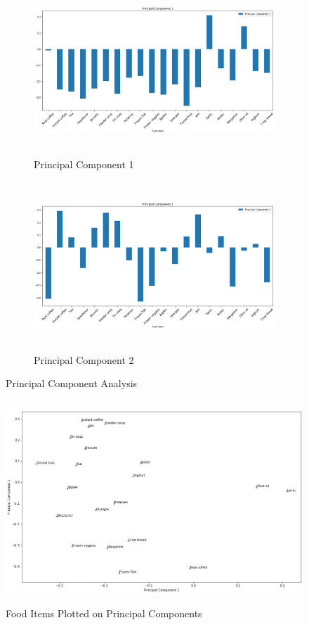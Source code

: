 \documentclass[twoside,10pt]{article}
\begin{document}
\begin{enumerate}
\begin{figure}
    \begin{subfigure}{.8\textwidth}
  \centering
  \includegraphics[height=2.5in]{Images/PCA1.png}  
  \caption{Principal Component 1}
  \label{fig:sub-first}
\end{subfigure}
\centering
\begin{subfigure}{.8\textwidth}
  \centering
  \includegraphics[height=2.5in]{Images/PCA2.png}  
  \caption{Principal Component 2}
  \label{fig:sub-first}
\end{subfigure}
\caption{Principal Component Analysis}
\label{fig:fig}
\end{figure}

\begin{figure}
\centering
\includegraphics[height=3in]{Images/PCAFoods.png}
\caption{Food Items Plotted on Principal Components}
\end{figure}
 


\end{enumerate}
\end{document}
